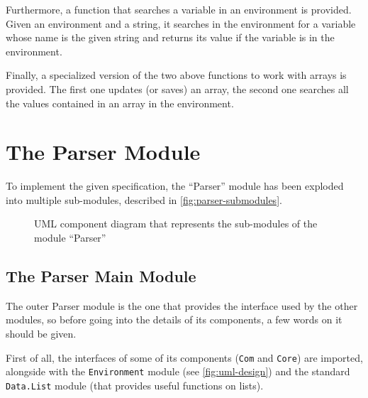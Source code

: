 \documentclass{esposito-documentation}
\begin{document}
Furthermore, a function that searches a variable in an environment is provided.
Given an environment and a string, it searches in the environment for a
variable whose name is the given string and returns its value if the variable
is in the environment.



Finally, a specialized version of the two above functions to work with arrays
is provided. The first one updates (or saves) an array, the second one searches
all the values contained in an array in the environment.




\section{The Parser Module}

To implement the given specification, the ``Parser'' module has been exploded
into multiple sub-modules, described in
\autoref{fig:parser-submodules}.

\begin{figure}[H]
	\centering
	\caption{UML component diagram that represents the sub-modules of the module ``Parser''}
	\label{fig:parser-submodules}
\end{figure}

\subsection{The Parser Main Module}


The outer Parser module is the one that provides the interface used by the
other modules, so before going into the details of its components, a few words
on it should be given.

First of all, the interfaces of some of its components (\texttt{Com} and
\texttt{Core}) are imported, alongside with the \texttt{Environment} module
(see \autoref{fig:uml-design}) and the standard \texttt{Data.List} module (that
provides useful functions on lists).
\end{document}
